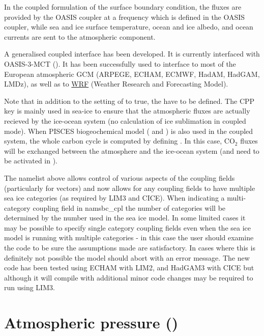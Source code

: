 \documentclass[NEMO_book]{subfiles}
\begin{document}
In the coupled formulation of the surface boundary condition, the fluxes are 
provided by the OASIS coupler at a frequency which is defined in the OASIS coupler, 
while sea and ice surface temperature, ocean and ice albedo, and ocean currents 
are sent to the atmospheric component.

A generalised coupled interface has been developed. 
It is currently interfaced with OASIS-3-MCT (). 
It has been successfully used to interface \NEMO to most of the European atmospheric 
GCM (ARPEGE, ECHAM, ECMWF, HadAM, HadGAM, LMDz), 
as well as to \href{http://wrf-model.org/}{WRF} (Weather Research and Forecasting Model).

Note that in addition to the setting of  to true, the  have to be defined. 
The CPP key is mainly used in sea-ice to ensure that the atmospheric fluxes are 
actually recieved by the ice-ocean system (no calculation of ice sublimation in coupled mode).
When PISCES biogeochemical model ( and ) is also used in the coupled system, 
the whole carbon cycle is computed by defining . In this case, 
CO$_2$ fluxes will be exchanged between the atmosphere and the ice-ocean system (and need to be activated in  ).

The namelist above allows control of various aspects of the coupling fields (particularly for
vectors) and now allows for any coupling fields to have multiple sea ice categories (as required by LIM3
and CICE).  When indicating a multi-category coupling field in namsbc{\_}cpl the number of categories will be
determined by the number used in the sea ice model.  In some limited cases it may be possible to specify 
single category coupling fields even when the sea ice model is running with multiple categories - in this
case the user should examine the code to be sure the assumptions made are satisfactory.  In cases where
this is definitely not possible the model should abort with an error message.  The new code has been tested using
ECHAM with LIM2, and HadGAM3 with CICE but although it will compile with  additional minor code changes
may be required to run using LIM3.


\section   [Atmospheric pressure (\textit{sbcapr})]
			{Atmospheric pressure ()}
\label{SBC_apr}
\end{document}
